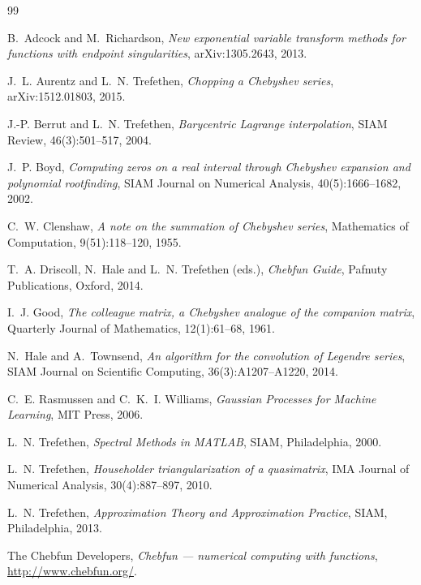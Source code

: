 \documentclass[11pt,a4paper]{article}
\begin{document}
\begin{thebibliography}{99}

B.~Adcock and M.~Richardson,
\emph{New exponential variable transform methods for functions with endpoint
singularities},
arXiv:1305.2643, 2013.

J.~L. Aurentz and L.~N. Trefethen,
\emph{Chopping a Chebyshev series},
arXiv:1512.01803, 2015.

J.-P. Berrut and L.~N. Trefethen,
\emph{Barycentric Lagrange interpolation},
SIAM Review, 46(3):501--517, 2004.

J.~P. Boyd,
\emph{Computing zeros on a real interval through Chebyshev expansion and
polynomial rootfinding},
SIAM Journal on Numerical Analysis, 40(5):1666--1682, 2002.

C.~W. Clenshaw,
\emph{A note on the summation of Chebyshev series},
Mathematics of Computation, 9(51):118--120, 1955.

T.~A. Driscoll, N.~Hale and L.~N. Trefethen (eds.),
\emph{Chebfun Guide},
Pafnuty Publications, Oxford, 2014.

I.~J. Good,
\emph{The colleague matrix, a Chebyshev analogue of the companion matrix},
Quarterly Journal of Mathematics, 12(1):61--68, 1961.

N.~Hale and A.~Townsend,
\emph{An algorithm for the convolution of Legendre series},
SIAM Journal on Scientific Computing, 36(3):A1207--A1220, 2014.

C.~E. Rasmussen and C.~K.~I. Williams,
\emph{Gaussian Processes for Machine Learning},
MIT Press, 2006.

L.~N. Trefethen,
\emph{Spectral Methods in MATLAB},
SIAM, Philadelphia, 2000.

L.~N. Trefethen,
\emph{Householder triangularization of a quasimatrix},
IMA Journal of Numerical Analysis, 30(4):887--897, 2010.

L.~N. Trefethen,
\emph{Approximation Theory and Approximation Practice},
SIAM, Philadelphia, 2013.

The Chebfun Developers,
\emph{Chebfun --- numerical computing with functions},
\url{http://www.chebfun.org/}.

\end{thebibliography}
\end{document}
